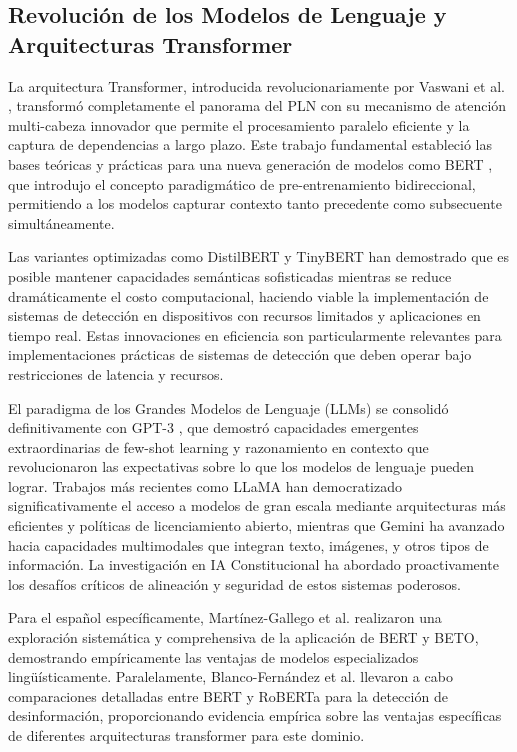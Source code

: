 \subsection{Revolución de los Modelos de Lenguaje y Arquitecturas Transformer}

La arquitectura Transformer, introducida revolucionariamente por Vaswani et al. \cite{vaswani2017attention}, transformó completamente el panorama del PLN con su mecanismo de atención multi-cabeza innovador que permite el procesamiento paralelo eficiente y la captura de dependencias a largo plazo. Este trabajo fundamental estableció las bases teóricas y prácticas para una nueva generación de modelos como BERT \cite{devlin2018bert}, que introdujo el concepto paradigmático de pre-entrenamiento bidireccional, permitiendo a los modelos capturar contexto tanto precedente como subsecuente simultáneamente.

Las variantes optimizadas como DistilBERT \cite{sanh2019distilbert} y TinyBERT \cite{jiao2019tinybert} han demostrado que es posible mantener capacidades semánticas sofisticadas mientras se reduce dramáticamente el costo computacional, haciendo viable la implementación de sistemas de detección en dispositivos con recursos limitados y aplicaciones en tiempo real. Estas innovaciones en eficiencia son particularmente relevantes para implementaciones prácticas de sistemas de detección que deben operar bajo restricciones de latencia y recursos.

El paradigma de los Grandes Modelos de Lenguaje (LLMs) se consolidó definitivamente con GPT-3 \cite{brown2020language}, que demostró capacidades emergentes extraordinarias de few-shot learning y razonamiento en contexto que revolucionaron las expectativas sobre lo que los modelos de lenguaje pueden lograr. Trabajos más recientes como LLaMA \cite{touvron2023llama} han democratizado significativamente el acceso a modelos de gran escala mediante arquitecturas más eficientes y políticas de licenciamiento abierto, mientras que Gemini \cite{gemini2023family} ha avanzado hacia capacidades multimodales que integran texto, imágenes, y otros tipos de información. La investigación en IA Constitucional \cite{bai2022constitutional} ha abordado proactivamente los desafíos críticos de alineación y seguridad de estos sistemas poderosos.

Para el español específicamente, Martínez-Gallego et al. \cite{martinez2021fake} realizaron una exploración sistemática y comprehensiva de la aplicación de BERT y BETO, demostrando empíricamente las ventajas de modelos especializados lingüísticamente. Paralelamente, Blanco-Fernández et al. \cite{blanco2024enhancing} llevaron a cabo comparaciones detalladas entre BERT y RoBERTa para la detección de desinformación, proporcionando evidencia empírica sobre las ventajas específicas de diferentes arquitecturas transformer para este dominio.


